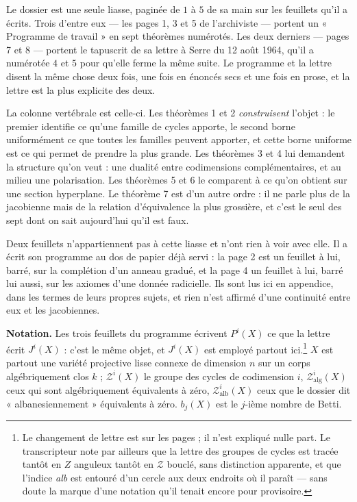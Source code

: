 \documentclass[11pt,a4paper]{article}
\begin{document}
Le dossier est une seule liasse, paginée de $1$ à $5$ de sa main sur les
feuillets qu'il a écrits. Trois d'entre eux — les pages 1, 3 et 5 de
l'archiviste — portent un « Programme de travail » en sept théorèmes numérotés.
Les deux derniers — pages 7 et 8 — portent le tapuscrit de sa lettre à Serre du
12 août 1964, qu'il a numérotée $4$ et $5$ pour qu'elle ferme la même suite. Le
programme et la lettre disent la même chose deux fois, une fois en énoncés secs
et une fois en prose, et la lettre est la plus explicite des deux.

La colonne vertébrale est celle-ci. Les théorèmes 1 et 2 \emph{construisent}
l'objet : le premier identifie ce qu'une famille de cycles apporte, le second
borne uniformément ce que toutes les familles peuvent apporter, et cette borne
uniforme est ce qui permet de prendre la plus grande. Les théorèmes 3 et 4 lui
demandent la structure qu'on veut : une dualité entre codimensions
complémentaires, et au milieu une polarisation. Les théorèmes 5 et 6 le
comparent à ce qu'on obtient sur une section hyperplane. Le théorème 7 est d'un
autre ordre : il ne parle plus de la jacobienne mais de la relation
d'équivalence la plus grossière, et c'est le seul des sept dont on sait
aujourd'hui qu'il est faux.

Deux feuillets n'appartiennent pas à cette liasse et n'ont rien à voir avec
elle. Il a écrit son programme au dos de papier déjà servi : la page 2 est un
feuillet à lui, barré, sur la complétion d'un anneau gradué, et la page 4 un
feuillet à lui, barré lui aussi, sur les axiomes d'une donnée radicielle. Ils
sont lus ici en appendice, dans les termes de leurs propres sujets, et rien
n'est affirmé d'une continuité entre eux et les jacobiennes.

\textbf{Notation.} Les trois feuillets du programme écrivent $P^{i}(X)$ ce que
la lettre écrit $J^{i}(X)$ : c'est le même objet, et $J^{i}(X)$ est employé
partout ici.\footnote{Le changement de lettre est sur les pages ; il n'est
expliqué nulle part. Le transcripteur note par ailleurs que la lettre des
groupes de cycles est tracée tantôt en $Z$ anguleux tantôt en $\mathcal{Z}$
bouclé, sans distinction apparente, et que l'indice \emph{alb} est entouré d'un
cercle aux deux endroits où il paraît — sans doute la marque d'une notation
qu'il tenait encore pour provisoire.} $X$ est partout une variété projective
lisse connexe de dimension $n$ sur un corps algébriquement clos $k$ ;
$\mathcal{Z}^{i}(X)$ le groupe des cycles de codimension $i$,
$\mathcal{Z}^{i}_{\mathrm{alg}}(X)$ ceux qui sont algébriquement équivalents à
zéro, $\mathcal{Z}^{i}_{\mathrm{alb}}(X)$ ceux que le dossier dit
« albanesiennement » équivalents à zéro. $b_{j}(X)$ est le $j$-ième nombre de
Betti.
\end{document}
